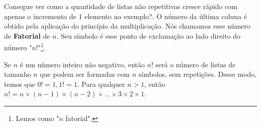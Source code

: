 \documentclass[main.tex]{subfiles}
\begin{document}
Consegue ver como a quantidade de listas não repetitivas cresce rápido com apenas o incremento de 1 elemento no exemplo?. O número da última coluna é obtido pela aplicação do princípio da multiplicação. Nós chamamos esse número de \textbf{Fatorial} de $n$. Seu símbolo é esse ponto de exclamação ao lado direito do número "$n!$"\footnote{Lemos como "$n$ fatorial".}.

\begin{definition}[Fatorial]
Se $n$ é um número inteiro não negativo, então $n!$ será o número de listas de tamanho $n$ que podem ser formadas com $n$ símbolos, sem repetições. Desse modo, temos que $0! = 1, 1! = 1$. Para qualquer $n > 1$, então $n! = n \times (n - 1) \times (n - 2) \times \dots \times 3 \times 2 \times 1 $.
\end{definition}
\end{document}
